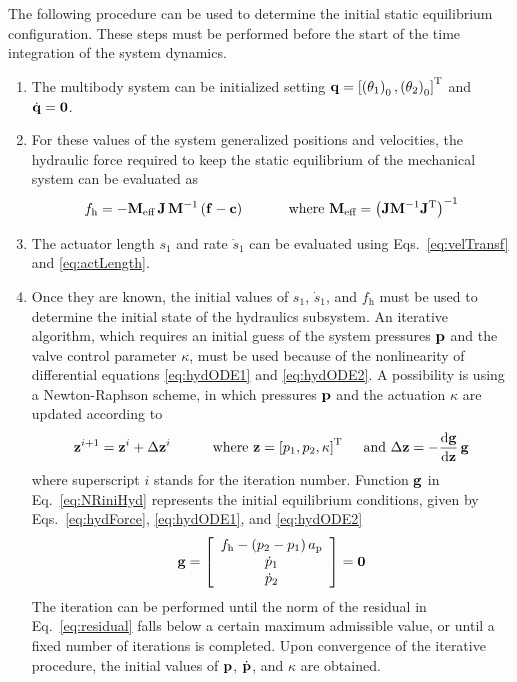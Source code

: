 \documentclass[fleqn,11pt]{article}
\newcommand{\plbr}[1]{ \left( #1 \right) }
\newcommand{\sqbr}[1]{ \left[ #1 \right] }
\newcommand{\matr}[2]{ \sqbr{\begin{array}{ #1 } #2 \end{array} }}
\newcommand{\totalD}[2]{ \dfrac{{\rm d} #1}{{\rm d} #2}}
\newcommand{\trans}		{ ^{\rm T} }
\newcommand{\inv}		{ ^{-1} }
\newcommand{\zero}		{ {\bf 0} }
\newcommand{\pos}		{ {\bf{q}} }
\newcommand{\vel}		{ {{\dot{\bf{q}}}} }
\newcommand{\Mass}		{ {\bf{M}} }
\newcommand{\fCor}		{ {\bf{c}} }
\newcommand{\f}			{ {\bf{f}} }
\newcommand{\Jac}		{ {\bf J} }
\newcommand{\pres}		{ {\bf{p}} }
\newcommand{\presd}		{ {\dot{\bf{p}}} }
\begin{document}
\vspace{0.5cm}
The following procedure can be used to determine the initial static equilibrium configuration.
These steps must be performed before the start of the time integration of the system dynamics.
\begin{enumerate}
	\item{
		The multibody system can be initialized setting $\pos = \sqbr{\plbr{\theta_1}_0,\plbr{\theta_2}_0}\trans$ and $\vel = \zero$.
	} 
	\item{
		For these values of the system generalized positions and velocities, the hydraulic force required to keep the static equilibrium of the mechanical system can be evaluated as \cite{Peiret2018}
		\begin{equation}
			f_{\text{h}} = -\Mass_{\text{eff}} \, \Jac \, \Mass\inv \plbr{\f-\fCor}\,
			\quad\quad\quad
			{\text{where }} \Mass_{\text{eff}} = \plbr{\Jac \Mass\inv \Jac\trans}\inv
			\label{eq:effectiveForce}
		\end{equation}
	}
	\item{
		The actuator length $s_1$ and rate $\dot{s}_1$ can be evaluated using Eqs.~\eqref{eq:velTransf} and \eqref{eq:actLength}.
	}
	\item{
		Once they are known, the initial values of $s_1$, $\dot{s}_1$, and $f_{\text{h}}$ must be used to determine the initial state of the hydraulics subsystem.
		An iterative algorithm, which requires an initial guess of the system pressures $\pres$ and the valve control parameter $\kappa$, must be used because of the nonlinearity of differential equations \eqref{eq:hydODE1} and \eqref{eq:hydODE2}.
		A possibility is using a Newton-Raphson scheme, in which pressures $\pres$ and the actuation $\kappa$ are updated according to
		\begin{equation}
			{\bf z}^{i+1} = {\bf z}^{i} + \Delta{\bf z}^{i}  
			\quad \quad \quad \text{where } {\bf z} = \sqbr{p_1, p_2, \kappa}\trans
			\quad \text{ and }
			\Delta{\bf z} = - \totalD{\bf g}{\bf z}\, {\bf g}
			\label{eq:NRiniHyd}
		\end{equation}
		where superscript $i$ stands for the iteration number.
		Function $\bf g$ in Eq.~\eqref{eq:NRiniHyd} represents the initial equilibrium conditions, given by Eqs.~\eqref{eq:hydForce}, \eqref{eq:hydODE1}, and \eqref{eq:hydODE2}
		\begin{equation}
			{\bf g} = \matr{c}{
				f_{\text{h}} - \plbr{p_2-p_1}a_{\text{p}} \\ \dot{p}_1 \\ \dot{p}_2
			} = \zero
			\label{eq:residual}
		\end{equation} 
		The iteration can be performed until the norm of the residual in Eq.~\eqref{eq:residual} falls below a certain maximum admissible value, or until a fixed number of iterations is completed.
		Upon convergence of the iterative procedure, the initial values of $\pres$, $\presd$, and $\kappa$ are obtained.
	}
\end{enumerate}
\end{document}
